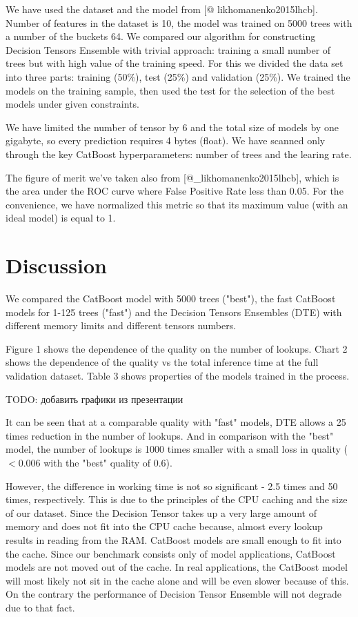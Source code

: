 \documentclass[a4paper]{jpconf}
\begin{document}
We have used the dataset and the model from [@ likhomanenko2015lhcb]. Number of features in the dataset is 10, the model was trained on 5000 trees with a number of the buckets 64. We compared our algorithm for constructing Decision Tensors Ensemble with trivial approach: training a small number of trees but with high value of the training speed.
For this we divided the data set into three parts: training (50\%), test (25\%) and validation (25\%). We trained the models on the training sample, then used the test for the selection of the best models under given constraints.

We have limited the number of tensor by 6 and the total size of models by one gigabyte, so every prediction requires 4 bytes (float). We have scanned only through the key CatBoost hyperparameters: number of trees and the learing rate.

The figure of merit we've taken also from [@_likhomanenko2015lhcb], which is the area under the ROC curve where False Positive Rate less than 0.05. For the convenience, we have normalized this metric so that its maximum value (with an ideal model) is equal to 1.

\section{Discussion}

We compared the CatBoost model with 5000 trees ("best"), the fast CatBoost models for 1-125 trees ("fast") and the Decision Tensors Ensembles (DTE) with different memory limits and different tensors numbers.

Figure 1 shows the dependence of the quality on the number of lookups. Chart 2 shows the dependence of the quality vs the total inference time at the full validation dataset. Table 3 shows properties of the models trained in the process.

TODO: добавить графики из презентации

It can be seen that at a comparable quality with "fast" models, DTE allows a 25 times reduction in the number of lookups. And in comparison with the "best" model, the number of lookups is 1000 times smaller with a small loss in quality ($ <0.006 $ with the "best" quality of 0.6).

However, the difference in working time is not so significant - 2.5 times and 50 times, respectively. This is due to the principles of the CPU caching and the size of our dataset. Since the Decision Tensor takes up a very large amount of memory and does not fit into the CPU cache because, almost every lookup results in reading from the RAM. CatBoost models are small enough to fit into the cache. Since our benchmark consists only of model applications, CatBoost models are not moved out of the cache. In real applications, the CatBoost model will most likely not sit in the cache alone and will be even slower because of this. On the contrary the performance of Decision Tensor Ensemble will not degrade due to that fact.
\end{document}
